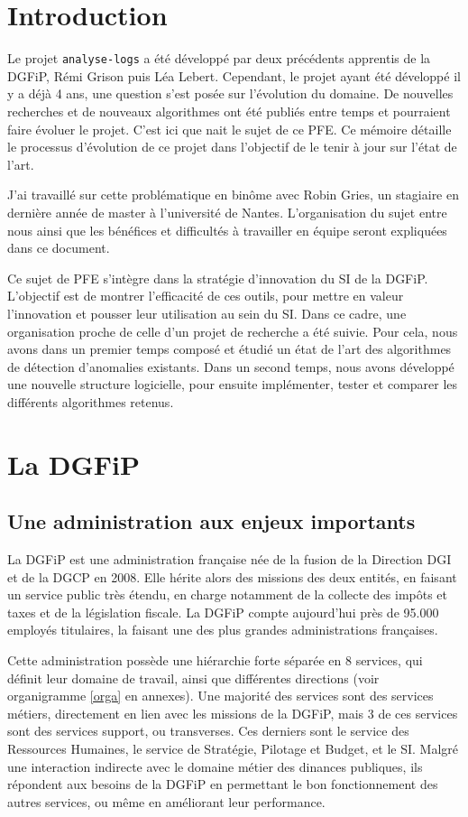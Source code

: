 \documentclass[openany, 11pt]{memoir}
\newcommand\chapters[1]{
	\chapter*{#1}
	\addcontentsline{toc}{chapter}{#1}
}
\begin{document}
\mainmatter
\pagestyle{fancy}
\glsresetall
\chapters{Introduction}

Le projet \texttt{analyse-logs} a été développé par deux précédents apprentis de la \gls{DGFiP}, Rémi Grison puis Léa Lebert. Cependant, le projet ayant été développé il y a déjà 4 ans, une question s'est posée sur l'évolution du domaine. De nouvelles recherches et de nouveaux algorithmes ont été publiés entre temps et pourraient faire évoluer le projet. C'est ici que nait le sujet de ce PFE. Ce mémoire détaille le processus d'évolution de ce projet dans l'objectif de le tenir à jour sur l'état de l'art.

\bigskip
J'ai travaillé sur cette problématique en binôme avec Robin Gries, un stagiaire en dernière année de master à l'université de Nantes. L'organisation du sujet entre nous ainsi que les bénéfices et difficultés à travailler en équipe seront expliquées dans ce document.

\bigskip
Ce sujet de PFE s'intègre dans la stratégie d'innovation du \gls{SI} de la \gls{DGFiP}. L'objectif est de montrer l'efficacité de ces outils, pour mettre en valeur l'innovation et pousser leur utilisation au sein du \gls{SI}. Dans ce cadre, une organisation proche de celle d'un projet de recherche a été suivie. Pour cela, nous avons dans un premier temps composé et étudié un état de l'art des algorithmes de détection d'anomalies existants. Dans un second temps, nous avons développé une nouvelle structure logicielle, pour ensuite implémenter, tester et comparer les différents algorithmes retenus.

\newpage
\chapter{La DGFiP}

\section{Une administration aux enjeux importants}
\label{dgfip}
La \gls{DGFiP} est une administration française née de la fusion de la Direction \gls{DGI} et de la \gls{DGCP} en 2008. Elle hérite alors des missions des deux entités, en faisant un service public très étendu, en charge notamment de la collecte des impôts et taxes et de la législation fiscale. La DGFiP compte aujourd'hui près de 95.000 employés titulaires, la faisant une des plus grandes administrations françaises.

Cette administration possède une hiérarchie forte séparée en 8 services, qui définit leur domaine de travail, ainsi que différentes directions (voir organigramme \ref{orga} en annexes). Une majorité des services sont des services métiers, directement en lien avec les missions de la \gls{DGFiP}, mais 3 de ces services sont des services support, ou \glspl{transverse}. Ces derniers sont le service des Ressources Humaines, le service de Stratégie, Pilotage et Budget, et le \gls{SI}. Malgré une interaction indirecte avec le domaine métier des dinances publiques, ils répondent aux besoins de la DGFiP en permettant le bon fonctionnement des autres services, ou même en améliorant leur performance.
\end{document}
